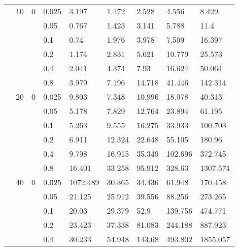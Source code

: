 \begin{longtable}{|l|l|l|l|l|l|l|l|l|}
\cmidrule{2-9} & 10  & 0        & 0.025          & 3.197      & 1.172      & 2.528      & 4.556      & 8.429      \\
\cmidrule{4-9} &     &          & 0.05           & 0.767      & 1.423      & 3.141      & 5.788      & 11.4       \\
\cmidrule{4-9} &     &          & 0.1            & 0.74       & 1.976      & 3.978      & 7.509      & 16.397     \\
\cmidrule{4-9} &     &          & 0.2            & 1.174      & 2.831      & 5.621      & 10.779     & 25.573     \\
\cmidrule{4-9} &     &          & 0.4            & 2.041      & 4.374      & 7.93       & 16.624     & 50.064     \\
\cmidrule{4-9} &     &          & 0.8            & 3.979      & 7.196      & 14.718     & 41.446     & 142.314    \\
\cmidrule{2-9} & 20  & 0        & 0.025          & 9.803      & 7.348      & 10.996     & 18.078     & 40.313     \\
\cmidrule{4-9} &     &          & 0.05           & 5.178      & 7.829      & 12.764     & 23.894     & 61.195     \\
\cmidrule{4-9} &     &          & 0.1            & 5.263      & 9.555      & 16.275     & 33.933     & 100.703    \\
\cmidrule{4-9} &     &          & 0.2            & 6.911      & 12.324     & 22.648     & 55.105     & 180.96     \\
\cmidrule{4-9} &     &          & 0.4            & 9.798      & 16.915     & 35.349     & 102.696    & 372.745    \\
\cmidrule{4-9} &     &          & 0.8            & 16.401     & 33.258     & 95.912     & 328.63     & 1307.574   \\
\cmidrule{2-9} & 40  & 0        & 0.025          & 1072.489   & 30.365     & 34.436     & 61.948     & 170.458    \\
\cmidrule{4-9} &     &          & 0.05           & 21.125     & 25.912     & 39.556     & 88.256     & 273.265    \\
\cmidrule{4-9} &     &          & 0.1            & 20.03      & 29.379     & 52.9       & 139.756    & 474.771    \\
\cmidrule{4-9} &     &          & 0.2            & 23.423     & 37.338     & 81.083     & 244.188    & 887.923    \\
\cmidrule{4-9} &     &          & 0.4            & 30.233     & 54.948     & 143.68     & 493.802    & 1855.057   \\

\end{longtable}
